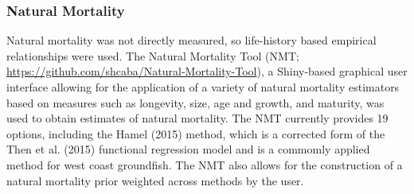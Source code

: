 \documentclass[11pt,
  english,
  a4paper,
]{article}
\begin{document}

\hypertarget{natural-mortality}{%
\subsubsection{Natural Mortality}\label{natural-mortality}}

\leavevmode\tagmcend\tagstructend


Natural mortality was not directly measured, so life-history based empirical relationships were used. The Natural Mortality Tool (NMT; {\url{https://github.com/shcaba/Natural-Mortality-Tool}\leavevmode\tagmcend\tagstructend}), a Shiny-based graphical user interface allowing for the application of a variety of natural mortality estimators based on measures such as longevity, size, age and growth, and maturity, was used to obtain estimates of natural mortality. The NMT currently provides 19 options, including the Hamel {(2015)\leavevmode\tagmcend\tagstructend} method, which is a corrected form of the Then et al. {(2015)\leavevmode\tagmcend\tagstructend} functional regression model and is a commomly applied method for west coast groundfish. The NMT also allows for the construction of a natural mortality prior weighted across methods by the user.

\leavevmode\tagmcend\tagstructend\par

\end{document}
